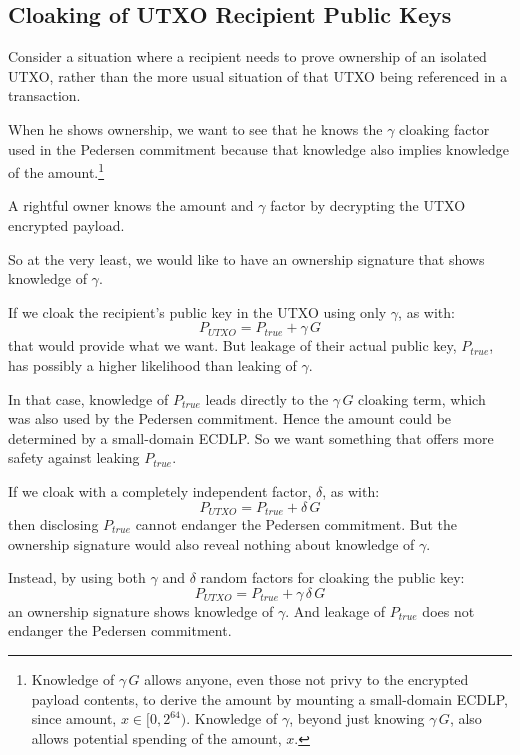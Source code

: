 \appendix

\subsection{Cloaking of UTXO Recipient Public Keys}
Consider a situation where a recipient needs to prove ownership of an isolated UTXO, rather than the more usual situation of that UTXO being referenced in a transaction.

When he shows ownership, we want to see that he knows the $\gamma$ cloaking factor used in the Pedersen commitment because that knowledge also implies knowledge of the amount.\footnote{Knowledge of $\gamma \, G$ allows anyone, even those not privy to the encrypted payload contents, to derive the amount by mounting a small-domain ECDLP, since amount, $x \in [0, 2^{64}).$ Knowledge of $\gamma$, beyond just knowing $\gamma \, G$, also allows potential spending of the amount, $x$.}

A rightful owner knows the amount and $\gamma$ factor by decrypting the UTXO encrypted payload.

So at the very least, we would like to have an ownership signature that shows knowledge of $\gamma$.

If we cloak the recipient's public key in the UTXO using only $\gamma$, as with:
$$P_{UTXO} = P_{true} + \gamma \, G$$
that would provide what we want. But leakage of their actual public key, $P_{true}$, has possibly a higher likelihood than leaking of $\gamma$.

In that case, knowledge of $P_{true}$ leads directly to the $\gamma \, G$ cloaking term, which was also used by the Pedersen commitment. Hence the amount could be determined by a small-domain ECDLP.
So we want something that offers more safety against leaking $P_{true}$. 

If we cloak with a completely independent factor, $\delta$, as with:
$$P_{UTXO} = P_{true} + \delta \, G$$
then disclosing $P_{true}$ cannot endanger the Pedersen commitment. But the ownership signature would also reveal nothing about knowledge of $\gamma$.

Instead, by using both $\gamma$ and $\delta$ random factors for cloaking the public key:
$$P_{UTXO} = P_{true} + \gamma \, \delta \, G$$
an ownership signature shows knowledge of $\gamma$. And leakage of $P_{true}$ does not endanger the Pedersen commitment.


